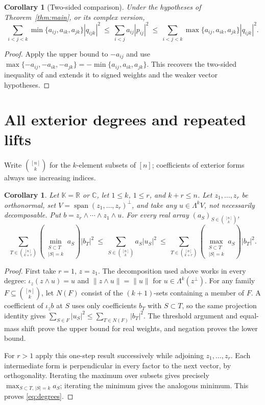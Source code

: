 \documentclass[11pt]{article}
\newtheorem{corollary}[theorem]{Corollary}
\newcommand{\R}{\mathbb{R}}
\newcommand{\C}{\mathbb{C}}
\begin{document}
\begin{corollary}[Two-sided comparison]\label{cor:twosided}
Under the hypotheses of Theorem~\ref{thm:main}, or its complex version,
\[
 \sum_{i<j<k}\min\{a_{ij},a_{ik},a_{jk}\}|q_{ijk}|^2
 \ \le\ \sum_{i<j}a_{ij}|p_{ij}|^2
 \ \le\ \sum_{i<j<k}\max\{a_{ij},a_{ik},a_{jk}\}|q_{ijk}|^2.
\]
\end{corollary}
\begin{proof}
Apply the upper bound to $-a_{ij}$ and use
$\max\{-a_{ij},-a_{ik},-a_{jk}\}=-\min\{a_{ij},a_{ik},a_{jk}\}$.
This recovers the two-sided inequality of \cite[Lemma~10]{mb1}
and extends it to signed weights and the weaker vector hypotheses.
\end{proof}

\section{All exterior degrees and repeated lifts}
Write $\binom{[n]}k$ for the $k$-element subsets of $[n]$; coefficients
of exterior forms always use increasing indices.
\begin{corollary}\label{cor:degrees}
Let $\mathbb K=\R$ or $\C$, let $1\le k$, $1\le r$, and $k+r\le n$.
Let $z_1,\ldots,z_r$ be orthonormal, set
$V=\operatorname{span}(z_1,\ldots,z_r)^\perp$, and take any
$u\in\Lambda^k V$, not necessarily decomposable. Put
$b=z_r\wedge\cdots\wedge z_1\wedge u$.
For every real array $(a_S)_{S\in\binom{[n]}k}$,
\begin{equation}\label{eq:degrees}
 \sum_{T\in\binom{[n]}{k+r}}\left(\min_{\substack{S\subset T\\|S|=k}}a_S\right)|b_T|^2
 \ \le\ \sum_{S\in\binom{[n]}k}a_S|u_S|^2
 \ \le\ \sum_{T\in\binom{[n]}{k+r}}\left(\max_{\substack{S\subset T\\|S|=k}}a_S\right)|b_T|^2.
\end{equation}
\end{corollary}
\begin{proof}
First take $r=1$, $z=z_1$. The decomposition used above works in every
degree: $\iota_z(z\wedge u)=u$ and $\|z\wedge u\|=\|u\|$ for
$u\in\Lambda^k(z^\perp)$. For any family $F\subseteq\binom{[n]}k$,
let $N(F)$ consist of the $(k+1)$-sets containing a member of $F$.
A coefficient of $\iota_z b$ at $S$ uses only coefficients $b_T$ with
$S\subset T$, so the same projection identity gives
$\sum_{S\in F}|u_S|^2\le\sum_{T\in N(F)}|b_T|^2$.
The threshold argument and equal-mass shift prove the upper bound for
real weights, and negation proves the lower bound.

For $r>1$ apply this one-step result successively while adjoining
$z_1,\ldots,z_r$. Each intermediate form is perpendicular in every
factor to the next vector, by orthogonality. Iterating the maximum
over subsets gives precisely $\max_{S\subset T,\,|S|=k}a_S$; iterating
the minimum gives the analogous minimum. This proves \eqref{eq:degrees}.
\end{proof}
\end{document}
